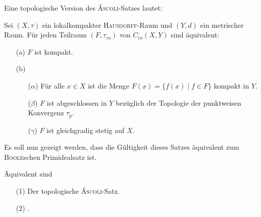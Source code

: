 Eine topologische Version des \textsc{Áscoli}-Satzes lautet:
\begin{defn}
  Sei $(X,\tau)$ ein lokalkompakter \textsc{Hausdorff}-Raum und $(Y,d)$ ein metrischer Raum.
  Für jeden Teilraum $(F,\tau_{co})$ von $C_{co}(X,Y)$ sind äquivalent:
  \begin{enumerate}
    \item[(a)] $F$ ist kompakt.
    \item[(b)] \begin{enumerate}
        \item[($\alpha$)] Für alle $x \in X$ ist die Menge $F(x) = \{f(x) \mid f \in F \}$ kompakt in $Y$.
        \item[($\beta$)]  $F$ ist abgeschlossen in $Y$ bezüglich der Topologie der punktweisen Konvergenz $\tau_p$.
        \item[($\gamma$)] $F$ ist gleichgradig stetig auf $X$.
      \end{enumerate}
  \end{enumerate}
\end{defn}

Es soll nun gezeigt werden, dass die Gültigkeit dieses Satzes äquivalent zum \textsc{Boole}schen Primidealsatz ist.

\begin{thm}
  \label{thm:ascoliPIT}
  Äquivalent sind
  \begin{enumerate}
    \item[(1)] Der topologische \textsc{Áscoli}-Satz.
    \item[(2)] \PIT.
  \end{enumerate}
\end{thm}

